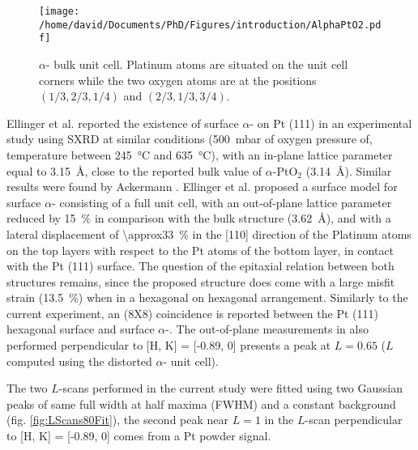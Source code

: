 \begin{SCfigure}
    \centering
    \texttt{[image: /home/david/Documents/PhD/Figures/introduction/AlphaPtO2.pdf]}
    \caption{
        $\alpha$- bulk unit cell.
        Platinum atoms are situated on the unit cell corners while the two oxygen atoms are at the positions $(1/3, 2/3, 1/4)$ and $(2/3, 1/3, 3/4)$.
    }
    \label{fig:AlphaPtO2}
\end{SCfigure}

Ellinger et al. \parencite*{Ellinger2008} reported the existence of surface $\alpha$- on Pt (111) in an experimental study using SXRD at similar conditions (\qty{500}{\milli\bar} of oxygen pressure of, temperature between \qty{245}{\degreeCelsius} and \qty{635}{\degreeCelsius}), with an in-plane lattice parameter equal to \qty{3.15}{\angstrom}, close to the reported bulk value of $\alpha$-PtO$_2$ (\qty{3.14}{\angstrom}).
Similar results were found by Ackermann \parencite*{Ackermann2007}.
Ellinger et al. \parencite*{Ellinger2008} proposed a surface model for surface $\alpha$- consisting of a full unit cell, with an out-of-plane lattice parameter reduced by \qty{15}{\percent} in comparison with the bulk structure (\qty{3.62}{\angstrom}), and with a lateral displacement of \qty{\approx33}{\percent} in the [110] direction of the Platinum atoms on the top layers with respect to the Pt atoms of the bottom layer, in contact with the Pt (111) surface.
The question of the epitaxial relation between both structures remains, since the proposed structure does come with a large misfit strain (\qty{13.5}{\percent}) when in a hexagonal on hexagonal arrangement.
Similarly to the current experiment, an (8X8) coincidence is reported between the Pt (111) hexagonal surface and surface $\alpha$-.
The out-of-plane measurements in \cite{Ellinger2008} also performed perpendicular to [H, K] = [-0.89, 0] presents a peak at $L=0.65$ ($L$ computed using the distorted $\alpha$- unit cell).

The two $L$-scans performed in the current study were fitted using two Gaussian peaks of same full width at half maxima (FWHM) and a constant background (fig. \ref{fig:LScans80Fit}), the second peak near $L=1$ in the $L$-scan perpendicular to [H, K] = [-0.89, 0] comes from a Pt powder signal.

